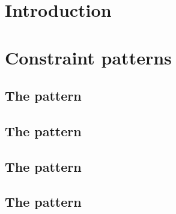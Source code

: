 \section{Introduction}

\section{Constraint patterns}

\subsection{The \rlpAddress{}          pattern} 
\subsection{The \rlpStorageKey{}       pattern} 
\subsection{The \rlpInteger{}          pattern} 
\subsection{The \rlpBytestringPrefix{} pattern} 
